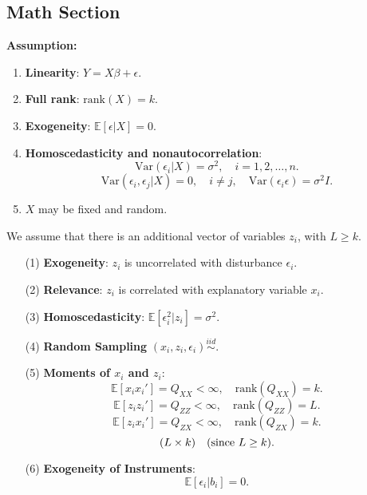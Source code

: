 \documentclass[12pt, oneside]{article}
\begin{document}
\subsection{Math Section}
\textbf{Assumption:}

\begin{enumerate}
    \item \textbf{Linearity}: \( Y = X\beta + \epsilon \).
    \item \textbf{Full rank}: \( \text{rank}(X) = k \).
    \item \textbf{Exogeneity}: \( \mathbb{E}[\epsilon | X] = 0 \).
    
    \begin{center}
    \end{center}

    \item \textbf{Homoscedasticity and nonautocorrelation}:
    \[
    \text{Var}(\epsilon_i | X) = \sigma^2, \quad i = 1,2, \dots, n.
    \]
    \[
    \text{Var}(\epsilon_i, \epsilon_j | X) = 0, \quad i \neq j, \quad \text{Var}(\epsilon_i \epsilon) = \sigma^2 I.
    \]

    \item \( X \) may be fixed and random.
\end{enumerate}

We assume that there is an additional vector of variables \( z_i \), with \( L \geq k \).

\begin{enumerate}
    \item[(1)] \textbf{Exogeneity}: \( z_i \) is uncorrelated with disturbance \( \epsilon_i \).
    \item[(2)] \textbf{Relevance}: \( z_i \) is correlated with explanatory variable \( x_i \).
    \item[(3)] \textbf{Homoscedasticity}: \( \mathbb{E}[\epsilon_i^2 | z_i] = \sigma^2 \).
    \item[(4)] \textbf{Random Sampling} \((x_i, z_i, \epsilon_i) \overset{iid}{\sim} \).
    \item[(5)] \textbf{Moments of \( x_i \) and \( z_i \)}:
    \[
    \mathbb{E}[x_i x_i'] = Q_{XX} < \infty, \quad \text{rank}(Q_{XX}) = k.
    \]
    \[
    \mathbb{E}[z_i z_i'] = Q_{ZZ} < \infty, \quad \text{rank}(Q_{ZZ}) = L.
    \]
    \[
    \mathbb{E}[z_i x_i'] = Q_{ZX} < \infty, \quad \text{rank}(Q_{ZX}) = k.
    \]
    \[
    (L \times k) \quad \text{(since \( L \geq k \))}.
    \]
    \item[(6)] \textbf{Exogeneity of Instruments}:
    \[
    \mathbb{E}[\epsilon_i | b_i] = 0.
    \]
\end{enumerate}
\end{document}

